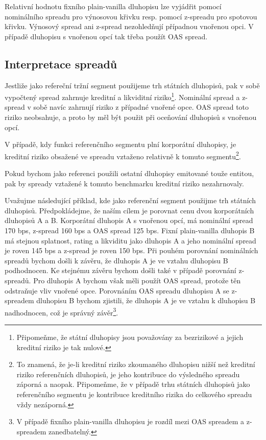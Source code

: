 \documentclass[a4paper]{book}
\begin{document}
Relativní hodnotu fixního plain-vanilla dluhopisu lze vyjádřit pomocí nominálního spreadu pro výnosovou křivku resp. pomocí z-spreadu pro spotovou křivku. Výnosový spread ani z-spread nezohledňují případnou vnořenou opci. V případě dluhopisu s vnořenou opcí tak třeba použít OAS spread.

\subsection{Interpretace spreadů}

Jestliže jako refereční tržní segment použijeme trh státních dluhopisů, pak v sobě vypočtený spread zahrnuje kreditní a likviditní riziko\footnote{Připomeňme, že státní dluhopisy jsou považovány za bezrizikové a jejich kreditní riziko je tak nulové.}. Nominální spread a z-spread v sobě navíc zahrnují riziko z případné vnořené opce. OAS spread toto riziko neobsahuje, a proto by měl být použit při oceňování dluhopisů s vnořenou opcí.

V případě, kdy funkci referenčního segmentu plní korporátní dluhopisy, je kreditní riziko obsažené ve spreadu vztaženo relativně k tomuto segmentu\footnote{To znamená, že je-li kreditní riziko zkoumaného dluhopisu nižší než kreditní riziko referenčních dluhopisů, je jeho kontribuce do výsledného spreadu záporná a naopak. Připomeňme, že v případě trhu státních dluhopisů jako referenčního segmentu je kontribuce kreditního rizika do celkového spreadu vždy nezáporná.}.

Pokud bychom jako referenci použili ostatní dluhopisy emitované touže entitou, pak by spready vztažené k tomuto benchmarku kreditní riziko nezahrnovaly.

Uvažujme následující příklad, kde jako referenční segment použijme trh státních dluhopisů. Předpokládejme, že naším cílem je porovnat cenu dvou korporátních dluhopisů A a B. Korporátní dluhopis A s vnořenou opcí, má nominální spread 170 bps, z-spread 160 bps a OAS spread 125 bps. Fixní plain-vanilla dluhopis B má stejnou splatnost, rating a likviditu jako dluhopis A a jeho nominální spread je roven 145 bps a z-spread je roven 150 bps. Při pouhém porovnání nominálních spreadů bychom došli k závěru, že dluhopis A je ve vztahu dluhopisu B podhodnocen. Ke stejnému závěru bychom došli také v případě porovnání z-spreadů. Pro dluhopis A bychom však měli použít OAS spread, protože těn odstraňuje vliv vnořené opce. Porovnáním OAS spreadu dluhopisu A se z-spreadem dluhopisu B bychom zjistili, že dluhopis A je ve vztahu k dluhopisu B nadhodnocen, což je správný závěr\footnote{V případě fixního plain-vanilla dluhopisu je rozdíl mezi OAS spreadem a z-spreadem zanedbatelný.}.
\end{document}
